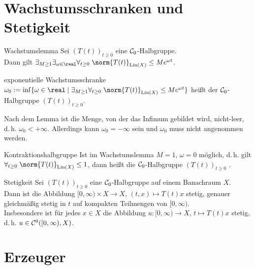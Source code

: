 \section{%
    Wachstumsschranken und Stetigkeit%
}

\begin{Lemma}{Wachstumslemma}
    Sei $(T(t))_{t \ge 0}$ eine $\mathcal{C}_0$-Halbgruppe.\\
    Dann gilt $\exists_{M \ge 1} \exists_{\omega \in \real} \forall_{t \ge 0}\;
    \norm{T(t)}_{\Lin(X)} \le Me^{\omega t}$.
\end{Lemma}

\begin{Def}{exponentielle Wachstumsschranke}
    $\omega_0 := \inf\{\omega \in \real \;|\; \exists_{M \ge 1} \forall_{t \ge 0}\;
    \norm{T(t)}_{\Lin(X)} \le Me^{\omega t}\}$ heißt 
    der $\mathcal{C}_0$-Halbgruppe $(T(t))_{t \ge 0}$.
\end{Def}

\begin{Bem}
    Nach dem Lemma ist die Menge, von der das Infimum gebildet wird, nicht-leer,
    d.\,h. $\omega_0 < +\infty$.
    Allerdings kann $\omega_0 = -\infty$ sein und $\omega_0$ muss nicht angenommen werden.
\end{Bem}

\begin{Def}{Kontraktionshalbgruppe}
    Ist im Wachstumslemma $M = 1$, $\omega = 0$ möglich, d.\,h. gilt\\
    $\forall_{t \ge 0}\; \norm{T(t)}_{\Lin(X)} \le 1$,
    dann heißt die $\mathcal{C}_0$-Halbgruppe $(T(t))_{t \ge 0}$ .
\end{Def}

\linie

\begin{Lemma}{Stetigkeit}
    Sei $(T(t))_{t \ge 0}$ eine $\mathcal{C}_0$-Halbgruppe auf einem Banachraum $X$.\\
    Dann ist die Abbildung $[0, \infty) \times X \to X$, $(t, x) \mapsto T(t) x$
    stetig, genauer gleichmäßig stetig in $t$ auf kompakten Teilmengen von $[0, \infty)$.\\
    Insbesondere ist für jedes $x \in X$ die Abbildung
    $u\colon [0, \infty) \to X$, $t \mapsto T(t) x$ stetig,\\
    d.\,h. $u \in \mathcal{C}^0([0, \infty), X)$.
\end{Lemma}

\pagebreak

\section{%
    Erzeuger%
}

